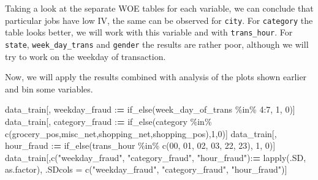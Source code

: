 \documentclass[
]{report}
\newenvironment{Shaded}{\begin{snugshade}}{\end{snugshade}}
\newcommand{\DecValTok}[1]{\textcolor[rgb]{0.00,0.00,0.81}{#1}}
\newcommand{\ErrorTok}[1]{\textcolor[rgb]{0.64,0.00,0.00}{\textbf{#1}}}
\newcommand{\FunctionTok}[1]{\textcolor[rgb]{0.00,0.00,0.00}{#1}}
\newcommand{\NormalTok}[1]{#1}
\newcommand{\OtherTok}[1]{\textcolor[rgb]{0.56,0.35,0.01}{#1}}
\newcommand{\SpecialCharTok}[1]{\textcolor[rgb]{0.00,0.00,0.00}{#1}}
\newcommand{\StringTok}[1]{\textcolor[rgb]{0.31,0.60,0.02}{#1}}
\begin{document}
Taking a look at the separate WOE tables for each variable, we can
conclude that particular jobs have low IV, the same can be observed for
\texttt{city}. For \texttt{category} the table looks better, we will
work with this variable and with \texttt{trans\_hour}. For
\texttt{state}, \texttt{week\_day\_trans} and \texttt{gender} the
results are rather poor, although we will try to work on the weekday of
transaction.

Now, we will apply the results combined with analysis of the plots shown
earlier and bin some variables.

\begin{Shaded}
\begin{Highlighting}[]
\NormalTok{data\_train[, weekday\_fraud }\SpecialCharTok{:}\ErrorTok{=} \FunctionTok{if\_else}\NormalTok{(week\_day\_of\_trans }\SpecialCharTok{\%in\%} \DecValTok{4}\SpecialCharTok{:}\DecValTok{7}\NormalTok{, }\DecValTok{1}\NormalTok{, }\DecValTok{0}\NormalTok{)]}
\NormalTok{data\_train[, category\_fraud }\SpecialCharTok{:}\ErrorTok{=} 
             \FunctionTok{if\_else}\NormalTok{(category }\SpecialCharTok{\%in\%} \FunctionTok{c}\NormalTok{(}\StringTok{\textquotesingle{}grocery\_pos\textquotesingle{}}\NormalTok{,}\StringTok{\textquotesingle{}misc\_net\textquotesingle{}}\NormalTok{,}\StringTok{\textquotesingle{}shopping\_net\textquotesingle{}}\NormalTok{,}\StringTok{\textquotesingle{}shopping\_pos\textquotesingle{}}\NormalTok{),}\DecValTok{1}\NormalTok{,}\DecValTok{0}\NormalTok{)]}
\NormalTok{data\_train[, hour\_fraud }\SpecialCharTok{:}\ErrorTok{=} 
             \FunctionTok{if\_else}\NormalTok{(trans\_hour }\SpecialCharTok{\%in\%} \FunctionTok{c}\NormalTok{(}\StringTok{\textquotesingle{}00\textquotesingle{}}\NormalTok{, }\StringTok{\textquotesingle{}01\textquotesingle{}}\NormalTok{, }\StringTok{\textquotesingle{}02\textquotesingle{}}\NormalTok{, }\StringTok{\textquotesingle{}03\textquotesingle{}}\NormalTok{, }\StringTok{\textquotesingle{}22\textquotesingle{}}\NormalTok{, }\StringTok{\textquotesingle{}23\textquotesingle{}}\NormalTok{), }\DecValTok{1}\NormalTok{, }\DecValTok{0}\NormalTok{)]}
\NormalTok{data\_train[,}\FunctionTok{c}\NormalTok{(}\StringTok{"weekday\_fraud"}\NormalTok{, }\StringTok{"category\_fraud"}\NormalTok{, }\StringTok{"hour\_fraud"}\NormalTok{)}\SpecialCharTok{:}\ErrorTok{=} 
             \FunctionTok{lapply}\NormalTok{(.SD, as.factor), .SDcols }\OtherTok{=} \FunctionTok{c}\NormalTok{(}\StringTok{"weekday\_fraud"}\NormalTok{, }\StringTok{"category\_fraud"}\NormalTok{, }\StringTok{"hour\_fraud"}\NormalTok{)]}
\end{Highlighting}
\end{Shaded}
\end{document}
